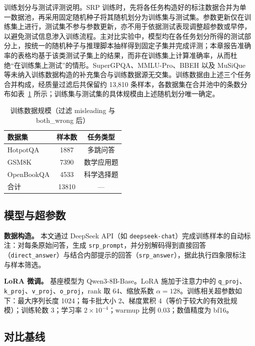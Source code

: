 训练划分与测试评测说明。SRP 训练时，先将各任务构造好的标注数据合并为单一数据池，再采用固定随机种子将其随机划分为训练集与测试集。参数更新仅在训练集上进行，测试集不参与参数更新，亦不用于依据测试表现调整超参数或早停，以避免测试信息渗入训练流程。主对比实验中，模型均在各任务划分所得的测试部分上，按统一的随机种子与推理脚本抽样得到固定子集并完成评测；本章报告准确率的表格均基于该类测试子集上的结果，而非在训练集上计算准确率，从而杜绝“在训练集上测试”的情形。SuperGPQA、MMLU-Pro、BBEH 以及 MuSiQue 等未纳入训练数据构造的补充集合与训练数据源无交集。训练数据由上述三个任务合并构成，经质量过滤后共保留约 13{,}810 条样本，各数据集在合并池中的条数分布如表~\ref{tab:dataset} 所示；训练集与测试集的具体规模由上述随机划分唯一确定。
\begin{table}[htbp]
    \centering
    \caption{训练数据规模（过滤 misleading 与 both\_wrong 后）}
    \label{tab:dataset}
    \begin{tabular}{lcc}
        \toprule
        \textbf{数据集} & \textbf{样本数} & \textbf{任务类型} \\
        \midrule
        HotpotQA  & 1887  & 多跳问答 \\
        GSM8K     & 7390  & 数学应用题 \\
        OpenBookQA & 4533 & 科学选择题 \\
        \midrule
        合计      & 13810 & --- \\
        \bottomrule
    \end{tabular}
\end{table}

\subsection{模型与超参数}

\textbf{数据构造。} 本文通过 DeepSeek API（如 \texttt{deepseek-chat}）完成训练样本的自动标注：对每条原始问答，生成 \texttt{srp\_prompt}，并分别解码得到直接回答（\texttt{direct\_answer}）与结合内部提示的回答（\texttt{srp\_answer}），据此执行四象限标注与样本筛选。

\textbf{LoRA 微调。} 基座模型为 Qwen3-8B-Base。LoRA 施加于注意力中的 \texttt{q\_proj}、\texttt{k\_proj}、\texttt{v\_proj}、\texttt{o\_proj}，rank 取 64、缩放系数 $\alpha=128$。训练相关超参数如下：最大序列长度 1024；每卡批大小 2、梯度累积 4（等价于较大的有效批规模）；训练轮数 3；学习率 $2\times10^{-4}$；warmup 比例 0.03；数值精度为 bf16。

\subsection{对比基线}


